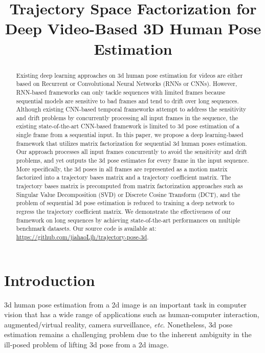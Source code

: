 \documentclass{bmvc2k}
\title{Trajectory Space Factorization for Deep Video-Based 3D Human Pose Estimation}
\begin{document}
\maketitle



\begin{abstract}

Existing deep learning approaches on 3d human pose estimation for videos are either based on Recurrent or Convolutional Neural Networks (RNNs or CNNs). However, RNN-based frameworks can only tackle sequences with limited frames because sequential models are sensitive to bad frames and tend to drift over long sequences. Although existing CNN-based temporal frameworks attempt to address the sensitivity and drift problems by concurrently processing all input frames in the sequence, the existing state-of-the-art CNN-based framework is limited to 3d pose estimation of a single frame from a sequential input.
In this paper, 
we propose a deep learning-based framework that utilizes matrix factorization for sequential 3d human poses estimation.  Our approach processes all input frames concurrently to avoid the sensitivity and drift problems, and yet outputs the 3d pose estimates for every frame in the input sequence.
More specifically, the 3d poses in all frames are represented as a motion matrix factorized into a trajectory bases matrix and a trajectory coefficient matrix.  
The trajectory bases matrix is precomputed from matrix factorization approaches such as 
Singular Value Decomposition (SVD) or Discrete Cosine Transform (DCT), and the problem of sequential 3d pose estimation is reduced to training a deep network to regress the trajectory coefficient matrix. 
We demonstrate the effectiveness of our framework on long sequences by achieving state-of-the-art performances on multiple benchmark datasets.
Our source code is available at: \url{https://github.com/jiahaoLjh/trajectory-pose-3d}.

\end{abstract}



\section{Introduction}
\label{sec:intro}

3d human pose estimation from a 2d image is an important task in computer vision that has a wide range of applications such as human-computer interaction, augmented/virtual reality, camera surveillance, \textit{etc}.
Nonetheless, 3d pose estimation remains a challenging problem due to the inherent ambiguity in the ill-posed problem of lifting 3d pose from a 2d image.
\end{document}
